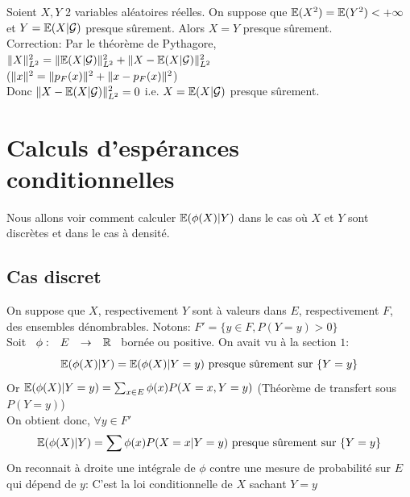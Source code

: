 \documentclass[]{report}
\begin{document}
    \begin{exo}{}{}
        Soient $X,Y$ 2 variables aléatoires réelles. On suppose que $\mathbb{E}(X^2)=\mathbb{E}(Y^2)<+\infty$ et $Y=\mathbb{E}(X|\mathcal{G})$ presque sûrement. Alors $X=Y$ presque sûrement.\\
        Correction: Par le théorème de Pythagore, $\lVert X \rVert_{L^2}^2=\lVert \mathbb{E}(X|\mathcal{G}) \rVert_{L^2}^2+\lVert X-\mathbb{E}(X|\mathcal{G}) \rVert_{L^2}^2$ \\
        ($\lVert x \rVert^2=\lVert p_F(x) \rVert^2+\lVert x-p_F(x) \rVert^2$)\\
        Donc $\lVert X-\mathbb{E}(X|\mathcal{G}) \rVert_{L^2}^2=0$ i.e. $X=\mathbb{E}(X|\mathcal{G})$ presque sûrement.
    \end{exo}

    \section{Calculs d'espérances conditionnelles}

    Nous allons voir comment calculer $\mathbb{E}(\phi(X)|Y)$ dans le cas où $X$ et $Y$ sont discrètes et dans le cas à densité.

    \subsection{Cas discret}

    On suppose que $X$, respectivement $Y$ sont à valeurs dans $E$, respectivement $F$, des ensembles dénombrables. Notons: $F'=\{y\in F, P(Y=y)>0\}$\\
    Soit $\begin{array}{ccccc} \phi : & E & \to & \mathbb{R} \end{array}$ bornée ou positive. On avait vu à la section $1$:
    \[\mathbb{E}(\phi(X)|Y)=\mathbb{E}(\phi(X)|Y=y)\text{ presque sûrement sur }\{Y=y\}\]
    Or $\mathbb{E}(\phi(X)|Y=y)=\sum_{x\in E}\phi(x)P(X=x,Y=y)$ (Théorème de transfert sous $P(Y=y)$)\\
    On obtient donc, $\forall y\in F'$
    \[\mathbb{E}(\phi(X)|Y)=\sum \phi(x)P(X=x|Y=y)\text{ presque sûrement sur }\{Y=y\}\]
    On reconnait à droite une intégrale de $\phi$ contre une mesure de probabilité sur $E$ qui dépend de $y$: C'est la loi conditionnelle de $X$ sachant $Y=y$
\end{document}
